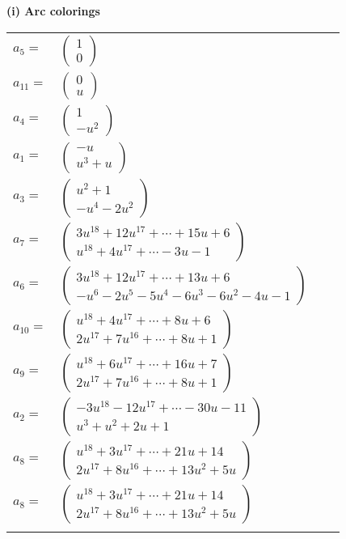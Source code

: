 \documentclass[1p]{elsarticle_modified}
\theoremstyle{definition}
\begin{document}
\flushleft \textbf{(i) Arc colorings}\\
\begin{tabular}{m{7pt} m{180pt} m{7pt} m{180pt} }
\flushright $a_{5}=$&$\begin{pmatrix}1\\0\end{pmatrix}$ \\
\flushright $a_{11}=$&$\begin{pmatrix}0\\u\end{pmatrix}$ \\
\flushright $a_{4}=$&$\begin{pmatrix}1\\- u^2\end{pmatrix}$ \\
\flushright $a_{1}=$&$\begin{pmatrix}- u\\u^3+u\end{pmatrix}$ \\
\flushright $a_{3}=$&$\begin{pmatrix}u^2+1\\- u^4-2 u^2\end{pmatrix}$ \\
\flushright $a_{7}=$&$\begin{pmatrix}3 u^{18}+12 u^{17}+\cdots+15 u+6\\u^{18}+4 u^{17}+\cdots-3 u-1\end{pmatrix}$ \\
\flushright $a_{6}=$&$\begin{pmatrix}3 u^{18}+12 u^{17}+\cdots+13 u+6\\- u^6-2 u^5-5 u^4-6 u^3-6 u^2-4 u-1\end{pmatrix}$ \\
\flushright $a_{10}=$&$\begin{pmatrix}u^{18}+4 u^{17}+\cdots+8 u+6\\2 u^{17}+7 u^{16}+\cdots+8 u+1\end{pmatrix}$ \\
\flushright $a_{9}=$&$\begin{pmatrix}u^{18}+6 u^{17}+\cdots+16 u+7\\2 u^{17}+7 u^{16}+\cdots+8 u+1\end{pmatrix}$ \\
\flushright $a_{2}=$&$\begin{pmatrix}-3 u^{18}-12 u^{17}+\cdots-30 u-11\\u^3+u^2+2 u+1\end{pmatrix}$ \\
\flushright $a_{8}=$&$\begin{pmatrix}u^{18}+3 u^{17}+\cdots+21 u+14\\2 u^{17}+8 u^{16}+\cdots+13 u^2+5 u\end{pmatrix}$\\ \flushright $a_{8}=$&$\begin{pmatrix}u^{18}+3 u^{17}+\cdots+21 u+14\\2 u^{17}+8 u^{16}+\cdots+13 u^2+5 u\end{pmatrix}$\\&\end{tabular}
\end{document}
